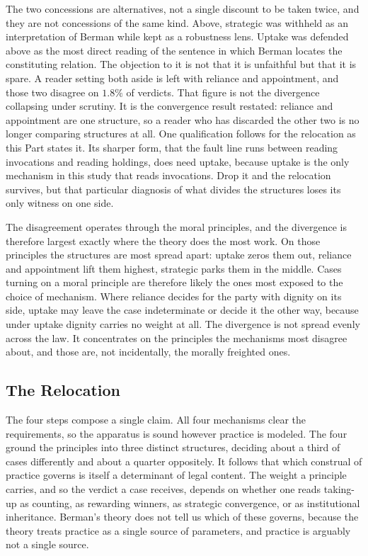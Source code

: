 The two concessions are alternatives, not a single discount to be taken
twice, and they are not concessions of the same kind. Above, strategic was withheld as an interpretation of Berman while kept as
a robustness lens. Uptake was defended above as the most direct reading of the sentence in which
Berman locates the constituting relation. The objection to it is not that it is
unfaithful but that it is spare.
A reader setting both aside is left with reliance and appointment, and
those two disagree on $1.8\%$ of verdicts. That figure is not the
divergence collapsing under scrutiny. It is the convergence result restated: reliance and appointment are one structure, so a
reader who has discarded the other two is no longer comparing structures
at all. One qualification follows for the relocation as this Part states it. Its
sharper form, that the fault line runs between reading
invocations and reading holdings, does need uptake, because uptake is the
only mechanism in this study that reads invocations. Drop it and the
relocation survives, but that particular diagnosis of what divides the
structures loses its only witness on one side.

The disagreement operates through the moral principles, and the
divergence is therefore largest exactly where the theory does the most work. On those
principles the structures are most spread apart: uptake zeros them out,
reliance and appointment lift them highest, strategic parks them in the
middle. Cases turning on a moral principle are therefore likely
the ones most exposed to the choice of mechanism. Where reliance decides for the party with dignity on its side, uptake may
leave the case indeterminate or decide it the other way, because under
uptake dignity carries no weight at all. The divergence is not spread evenly across the law. It concentrates on the
principles the mechanisms most disagree about, and those are, not incidentally, the morally freighted ones.

\subsection{The Relocation}

The four steps compose a single claim. All four mechanisms clear the
requirements, so the apparatus is sound however practice is modeled. The
four ground the principles into three distinct structures, deciding
about a third of cases differently and about a quarter oppositely. It
follows that which construal of practice governs is itself a determinant
of legal content. The weight a principle carries, and so the verdict a
case receives, depends on whether one reads taking-up as counting, as
rewarding winners, as strategic convergence, or as institutional
inheritance. Berman's theory does not tell us which of these governs, because the theory
treats practice as a single source of parameters, and practice is arguably not
a single source.

